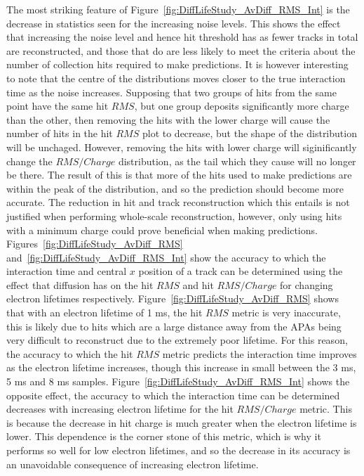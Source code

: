 The most striking feature of Figure~\ref{fig:DiffLifeStudy_AvDiff_RMS_Int} is the decrease in statistics seen for the increasing noise levels. This shows the effect that increasing the noise level and hence hit threshold has as fewer tracks in total are reconstructed, and those that do are less likely to meet the criteria about the number of collection hits required to make predictions. It is however interesting to note that the centre of the distributions moves closer to the true interaction time as the noise increases. Supposing that two groups of hits from the same point have the same hit $RMS$, but one group deposits significantly more charge than the other, then removing the hits with the lower charge will cause the number of hits in the hit $RMS$ plot to decrease, but the shape of the distribution will be unchaged. However, removing the hits with lower charge will siginificantly change the $RMS/Charge$ distribution, as the tail which they cause will no longer be there. The result of this is that more of the hits used to make predictions are within the peak of the distribution, and so the prediction should become more accurate. The reduction in hit and track reconstruction which this entails is not justified when performing whole-scale reconstruction, however, only using hits with a minimum charge could prove beneficial when making predictions. \\


Figures~\ref{fig:DiffLifeStudy_AvDiff_RMS} and~\ref{fig:DiffLifeStudy_AvDiff_RMS_Int} show the accuracy to which the interaction time and central $x$ position of a track can be determined using the effect that diffusion has on the hit $RMS$ and hit $RMS/Charge$ for changing electron lifetimes respectively. Figure~\ref{fig:DiffLifeStudy_AvDiff_RMS} shows that with an electron lifetime of 1 ms, the hit $RMS$ metric is very inaccurate, this is likely due to hits which are a large distance away from the APAs being very difficult to reconstruct due to the extremely poor lifetime. For this reason, the accuracy to which the hit $RMS$ metric predicts the interaction time improves as the electron lifetime increases, though this increase in small between the 3 ms, 5 ms and 8 ms samples. Figure~\ref{fig:DiffLifeStudy_AvDiff_RMS_Int} shows the opposite effect, the accuracy to which the interaction time can be determined decreases with increasing electron lifetime for the hit $RMS/Charge$ metric. This is because the decrease in hit charge is much greater when the electron lifetime is lower. This dependence is the corner stone of this metric, which is why it performs so well for low electron lifetimes, and so the decrease in its accuracy is an unavoidable consequence of increasing electron lifetime. \\

